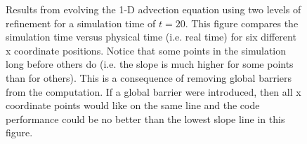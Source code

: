 \documentclass[prd,aps,showpacs,nofootinbib,floats,floatfix,twocolumn,letterpaper]{revtex4}
\begin{document}
\begin{widetext}
\begin{figure}
\caption{Results from evolving the 1-D advection equation using two levels of refinement for a simulation time of $t=20$.
This figure compares the simulation time versus physical time (i.e. real time) for six different x coordinate 
positions.  Notice that some points in the simulation long before others do (i.e. the slope is much higher for some points
than for others).  This is 
a consequence of removing global barriers from the computation.  If a global barrier were introduced, then all
x coordinate points would like on the same line and the code performance could be no better 
than the lowest slope line in this figure.}
\label{fig:no_barriers}
\end{figure}

\end{widetext}

%
%
\end{document}

